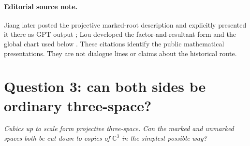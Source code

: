 \documentclass[11pt,a4paper]{article}
\numberwithin{equation}{section}
\theoremstyle{definition}
\theoremstyle{remark}
\newcommand{\C}{\mathbb C}
\newenvironment{userquestion}
  {\par\medskip\noindent{\color{userblue}\bfseries USER}\quad
   \begin{minipage}[t]{0.84\linewidth}\itshape}
  {\end{minipage}\par\medskip}
\begin{document}
\paragraph{Editorial source note.}
Jiang later posted the projective marked-root description and explicitly
presented it there as GPT output \cite{Jiang}; Lou developed the
factor-and-resultant form and the global chart used below \cite{Lou}.  These
citations identify the public mathematical presentations.  They are not
dialogue lines or claims about the historical route.

\section{Question 3: can both sides be ordinary three-space?}

\begin{userquestion}
Cubics up to scale form projective three-space.  Can the marked and unmarked
spaces both be cut down to copies of \(\C^3\) in the simplest possible way?
\end{userquestion}
\end{document}
